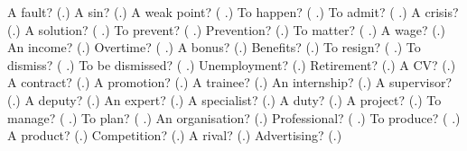 \begin{tcolorbox}[breakable,colback=teal!4,colframe=teal!35!black,title={Before you move on}]
A fault? (\textbf{}.) A sin? (\textbf{}.) A weak point? (\textbf{ }.) To happen? (\textbf{ }.) To admit? (\textbf{ }.) A crisis? (\textbf{}.) A solution? (\textbf{ }.) To prevent? (\textbf{ }.) Prevention? (\textbf{}.) To matter? (\textbf{ }.) A wage? (\textbf{}.) An income? (\textbf{}.) Overtime? (\textbf{ }.) A bonus? (\textbf{}.) Benefits? (\textbf{}.) To resign? (\textbf{ }.) To dismiss? (\textbf{ }.) To be dismissed? (\textbf{ }.) Unemployment? (\textbf{}.) Retirement? (\textbf{}.) A CV? (\textbf{}.) A contract? (\textbf{}.) A promotion? (\textbf{}.) A trainee? (\textbf{}.) An internship? (\textbf{}.) A supervisor? (\textbf{}.) A deputy? (\textbf{}.) An expert? (\textbf{}.) A specialist? (\textbf{}.) A duty? (\textbf{}.) A project? (\textbf{}.) To manage? (\textbf{ }.) To plan? (\textbf{  }.) An organisation? (\textbf{}.) Professional? (\textbf{ }.) To produce? (\textbf{ }.) A product? (\textbf{}.) Competition? (\textbf{}.) A rival? (\textbf{}.) Advertising? (\textbf{}.)
\end{tcolorbox}

